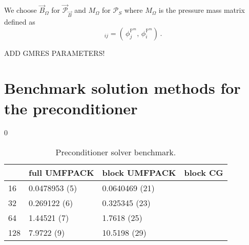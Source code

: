 \documentclass[a4paper,12pt,onecolumn]{article}
\newcommand{\pspace}{\mathbb{P}}
\begin{document}
We choose $\vec B_\Omega$ for $\vec{\mathcal{P}}_{\vec B}$ and $M_\Omega$ for 
$\mathcal{P}_S$ where $M_\Omega$ is the pressure mass matrix defined as
\begin{equation}
[M_\Omega]_{ij} = \left(\,\phi_j^{\pspace^m},\, \phi_i^{\pspace^m}\right)\,.
\end{equation}

ADD GMRES PARAMETERS! 

\section{Benchmark solution methods for the preconditioner} 
\label{sec:preconditioner_solver_benchmark}
\setcounter{equation} 0

\begin{table*}
 \center
\begin{tabular}{llll}
\hline
 & full UMFPACK & block UMFPACK & block CG \\
\hline
 16 & 0.0478953 (5) & 0.0640469 (21) & \\
 32 & 0.269122 (6) & 0.325345 (23) & \\
 64 & 1.44521 (7) & 1.7618 (25) & \\
128 & 7.9722 (9) & 10.5198 (29) & \\
\hline
\end{tabular}
\caption{Preconditioner solver benchmark.}
\label{tab:prec_solver_benchmark}
\end{table*}

\newpage


\end{document}

